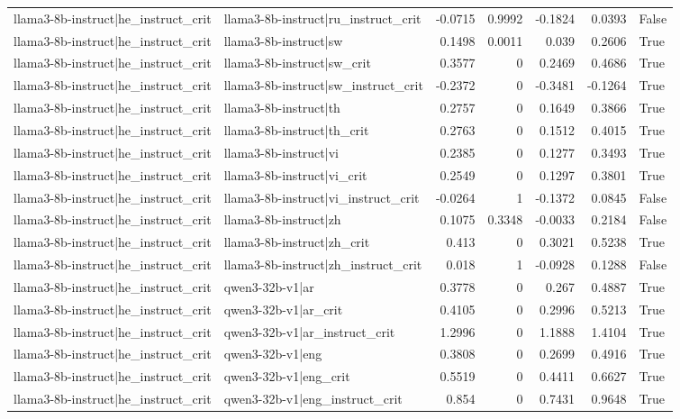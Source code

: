 \begin{table}
\begin{tabular}{l l r r r r l}
llama3-8b-instruct|he_instruct_crit & llama3-8b-instruct|ru_instruct_crit & -0.0715 & 0.9992 & -0.1824 & 0.0393 & False \\
llama3-8b-instruct|he_instruct_crit & llama3-8b-instruct|sw & 0.1498 & 0.0011 & 0.039 & 0.2606 & True \\
llama3-8b-instruct|he_instruct_crit & llama3-8b-instruct|sw_crit & 0.3577 & 0 & 0.2469 & 0.4686 & True \\
llama3-8b-instruct|he_instruct_crit & llama3-8b-instruct|sw_instruct_crit & -0.2372 & 0 & -0.3481 & -0.1264 & True \\
llama3-8b-instruct|he_instruct_crit & llama3-8b-instruct|th & 0.2757 & 0 & 0.1649 & 0.3866 & True \\
llama3-8b-instruct|he_instruct_crit & llama3-8b-instruct|th_crit & 0.2763 & 0 & 0.1512 & 0.4015 & True \\
llama3-8b-instruct|he_instruct_crit & llama3-8b-instruct|vi & 0.2385 & 0 & 0.1277 & 0.3493 & True \\
llama3-8b-instruct|he_instruct_crit & llama3-8b-instruct|vi_crit & 0.2549 & 0 & 0.1297 & 0.3801 & True \\
llama3-8b-instruct|he_instruct_crit & llama3-8b-instruct|vi_instruct_crit & -0.0264 & 1 & -0.1372 & 0.0845 & False \\
llama3-8b-instruct|he_instruct_crit & llama3-8b-instruct|zh & 0.1075 & 0.3348 & -0.0033 & 0.2184 & False \\
llama3-8b-instruct|he_instruct_crit & llama3-8b-instruct|zh_crit & 0.413 & 0 & 0.3021 & 0.5238 & True \\
llama3-8b-instruct|he_instruct_crit & llama3-8b-instruct|zh_instruct_crit & 0.018 & 1 & -0.0928 & 0.1288 & False \\
llama3-8b-instruct|he_instruct_crit & qwen3-32b-v1|ar & 0.3778 & 0 & 0.267 & 0.4887 & True \\
llama3-8b-instruct|he_instruct_crit & qwen3-32b-v1|ar_crit & 0.4105 & 0 & 0.2996 & 0.5213 & True \\
llama3-8b-instruct|he_instruct_crit & qwen3-32b-v1|ar_instruct_crit & 1.2996 & 0 & 1.1888 & 1.4104 & True \\
llama3-8b-instruct|he_instruct_crit & qwen3-32b-v1|eng & 0.3808 & 0 & 0.2699 & 0.4916 & True \\
llama3-8b-instruct|he_instruct_crit & qwen3-32b-v1|eng_crit & 0.5519 & 0 & 0.4411 & 0.6627 & True \\
llama3-8b-instruct|he_instruct_crit & qwen3-32b-v1|eng_instruct_crit & 0.854 & 0 & 0.7431 & 0.9648 & True \\

\end{tabular}
\end{table}
